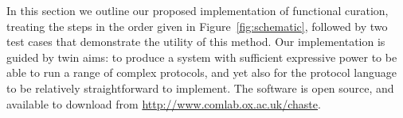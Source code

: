 \documentclass[preprint,authoryear,12pt]{elsarticle}
\newcommand{\Matlab}{{\sc Matlab}\textsuperscript{\textregistered}}
\begin{document}
In this section we outline our proposed implementation of functional curation, treating the steps in the order given in Figure~\ref{fig:schematic}, followed by two test cases that demonstrate the utility of this method.
Our implementation is guided by twin aims: to produce a system with sufficient expressive power to be able to run a range of complex protocols, and yet also for the protocol language to be relatively straightforward to implement.
The software is open source, and available to download from \url{http://www.comlab.ox.ac.uk/chaste}.
\end{document}
